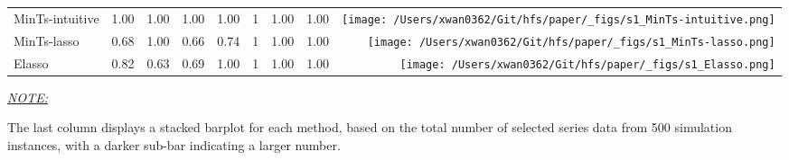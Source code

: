 \documentclass[11pt,a4paper,]{article}
\begin{document}
\begin{table}[!h]
{\begin{threeparttable}
\begin{tabular}{llrrrrrr>{}r}
MinTs-intuitive & 1.00 & 1.00 & 1.00 & 1.00 & 1 & 1.00 & 1.00 & \texttt{[image: /Users/xwan0362/Git/hfs/paper/\_figs/s1\_MinTs-intuitive.png]}\\
MinTs-lasso & 0.68 & 1.00 & 0.66 & 0.74 & 1 & 1.00 & 1.00 & \texttt{[image: /Users/xwan0362/Git/hfs/paper/\_figs/s1\_MinTs-lasso.png]}\\
\midrule
Elasso & 0.82 & 0.63 & 0.69 & 1.00 & 1 & 1.00 & 1.00 & \texttt{[image: /Users/xwan0362/Git/hfs/paper/\_figs/s1\_Elasso.png]}\\
\bottomrule
\end{tabular}
\begin{tablenotes}[para]
\item \underline{\textit{NOTE:}} 
\item The last column displays a stacked barplot for each method, based on the total number of selected series data from 500 simulation instances, with a darker sub-bar indicating a larger number.
\end{tablenotes}
\end{threeparttable}}
\endgroup{}
\end{table}
\end{document}
